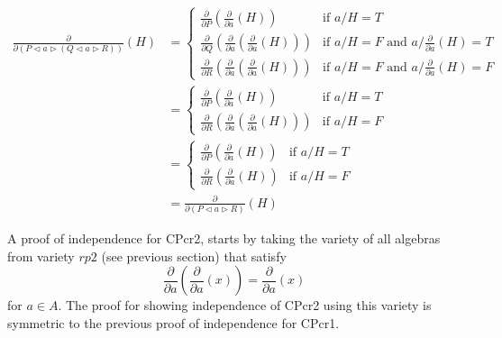 \documentclass[a4paper,twoside,openright]{report}
\newcommand{\dd}[1]{\frac{\partial}{\partial #1}}
\newcommand{\lef}{\ensuremath{\triangleleft}}
\newcommand{\rig}{\ensuremath{\triangleright}}
\begin{document}
\begin{align*}
\dd{(P\lef a\rig(Q\lef a\rig R))}(H)
&=\begin{cases}
\dd P(\dd a(H)) & \text{if $a/H=T$}\\
\dd Q(\dd a(\dd a(H))) & \text{if $a/H=F$ and $a/\dd a(H)=T$}\\
\dd R(\dd a(\dd a(H))) & \text{if $a/H=F$ and $a/\dd a(H)=F$}
\end{cases}\\
&=\begin{cases}
\dd P(\dd a(H)) & \text{if $a/H=T$}\\
\dd R(\dd a(\dd a(H))) & \text{if $a/H=F$}
\end{cases}\\
&=\begin{cases}
\dd P(\dd a(H)) & \text{if $a/H=T$}\\
\dd R(\dd a(H)) & \text{if $a/H=F$}
\end{cases}\\
&=\dd{(P\lef a\rig R)}(H)
\end{align*}

A proof of independence for CPcr2, starts by taking the variety of all algebras from variety $rp2$ (see previous section) that satisfy
\[
\dd a(\dd a(x)) = \dd a(x)
\]
for $a\in A$. The proof for showing independence of CPcr2 using this variety is symmetric to the previous proof of independence for CPcr1.
\end{document}
